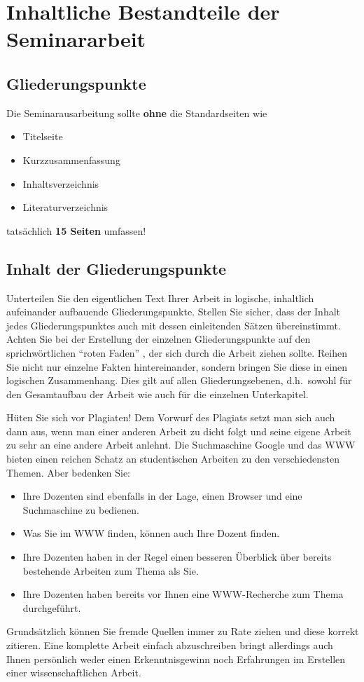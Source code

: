 %
\section{Inhaltliche Bestandteile der Seminararbeit}
\label{sec_inhalt}

\subsection{Gliederungspunkte}

Die Seminarausarbeitung sollte {\bf ohne} die Standardseiten wie
\begin{itemize}
\item Titelseite
\item Kurzzusammenfassung
\item Inhaltsverzeichnis
\item Literaturverzeichnis
\end{itemize}
tatsächlich {\bf 15 Seiten} umfassen!

\subsection{Inhalt der Gliederungspunkte}
Unterteilen Sie den eigentlichen Text Ihrer Arbeit in logische, inhaltlich aufeinander aufbauende Gliederungspunkte.
Stellen Sie sicher, dass der Inhalt jedes Gliederungspunktes auch mit dessen einleitenden Sätzen übereinstimmt.
Achten Sie bei der Erstellung der einzelnen Gliederungspunkte auf den sprichwörtlichen "`roten Faden"' , der sich durch die Arbeit ziehen sollte.
Reihen Sie nicht nur einzelne Fakten hintereinander, sondern bringen Sie diese in einen logischen Zusammenhang.
Dies gilt auf allen Gliederungsebenen, d.h.~sowohl für den Gesamtaufbau der Arbeit wie auch für die einzelnen Unterkapitel.

Hüten Sie sich vor Plagiaten!
Dem Vorwurf des Plagiats setzt man sich auch dann aus, wenn man einer anderen Arbeit zu dicht folgt und seine eigene Arbeit zu sehr an eine andere Arbeit anlehnt.
Die Suchmaschine Google und das WWW bieten einen reichen Schatz an studentischen Arbeiten zu den verschiedensten Themen.
Aber bedenken Sie:
\begin{itemize}
\item Ihre Dozenten sind ebenfalls in der Lage, einen Browser und eine Suchmaschine zu bedienen.
\item Was Sie im WWW finden, können auch Ihre Dozent finden.
\item Ihre Dozenten haben in der Regel einen besseren Überblick über bereits bestehende Arbeiten zum Thema als Sie.
\item Ihre Dozenten haben bereits vor Ihnen eine WWW-Recherche zum Thema durchgeführt.
\end{itemize}
Grundsätzlich können Sie fremde Quellen immer zu Rate ziehen und diese korrekt zitieren.
Eine komplette Arbeit einfach abzuschreiben bringt allerdings auch Ihnen persönlich weder einen Erkenntnisgewinn noch Erfahrungen im Erstellen einer wissenschaftlichen Arbeit.


